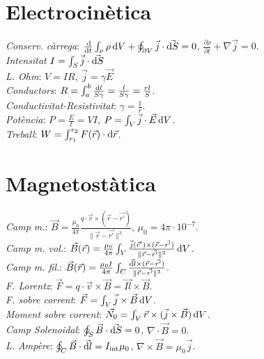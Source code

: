 \section{Electrocinètica}
\emph{Conserv. càrrega}: $\frac{\dif}{\dif t} \int_\nu \rho \dif V + 
                          \oint_{\partial V} \vec{j} \cdot \vec{\dif S} = 0$,
                          $\frac{\partial\rho}{\partial t} + \nabla \vec{j} = 0 $.\\
\emph{Intensitat} $I = \int_S \vec{j} \cdot \vec{\dif S}$\\
\emph{L. Ohm}: $V=IR$, $\vec{j} = \gamma \vec{E}$\\
\emph{Conductors}: $R = \int_a^b \frac{\dif l}{S \gamma} =  \frac{l}{S\gamma} = \frac{rl}{S}$. \\
\emph{Conductivitat-Resistivitat}: $\gamma = \frac{1}{r}$. \\
\emph{Potència}: $P=\frac{E}{t}=VI$, $P = \int_{V} \vec{j} \cdot \vec{E} \dif V$. \\
\emph{Treball}: $W=\int_{r_1}^{r_2} F(\vec{r}) \cdot \dif \vec{r}$.

\section{Magnetostàtica}
\emph{Camp m.}: $\vec{B} = \frac{\mu_0}{4\pi}\frac{q\cdot \vec{v}\times (\vec{r} - \vec{r'})}{\|\vec{r} -\vec{r'}\|^3}$, $\mu_0=4\pi \cdot 10^{-7}$. \\
\emph{Camp m. vol.}: $\vec{B}(\vec{r}) = \frac{\mu_0}{4\pi}\int_V
                     \frac{ \vec{j}(\vec{r}') \times (\vec{r} - \vec{r'})}
                     {\|\vec{r} -\vec{r'}\|^3} \dif V$.\\
\emph{Camp m. fil.}: $\vec{B}(\vec{r}) = \frac{\mu_0 I}{4\pi}\int_C
                     \frac{ \vec{\dif l} \times (\vec{r} - \vec{r'})}
                     {\|\vec{r} -\vec{r'}\|^3}$.\\
\emph{F. Lorentz}: $\vec{F} = q \cdot\vec{v}\times\vec{B} = \vec{Il} \times \vec{B}$. \\

\emph{F. sobre corrent}: $\vec{F} = \int_V \vec{j} \times \vec{B} \dif V$.\\
\emph{Moment sobre corrent}: $\vec{N_0} = \int_V \vec{r} \times (\vec{j} \times
                            \vec{B}) \dif V$.\\
\emph{Camp Solenoidal}: $\oint_S \vec{B} \cdot \vec{\dif S} = 0$, $\nabla \cdot \vec{B} = 0$.\\
\emph{L. Ampère}: $\oint_C \vec{B}\cdot \vec{\dif l} = I_{\text{int}} \mu_0$, $\nabla \times \vec{B} = \mu_0 \vec{j}$.

